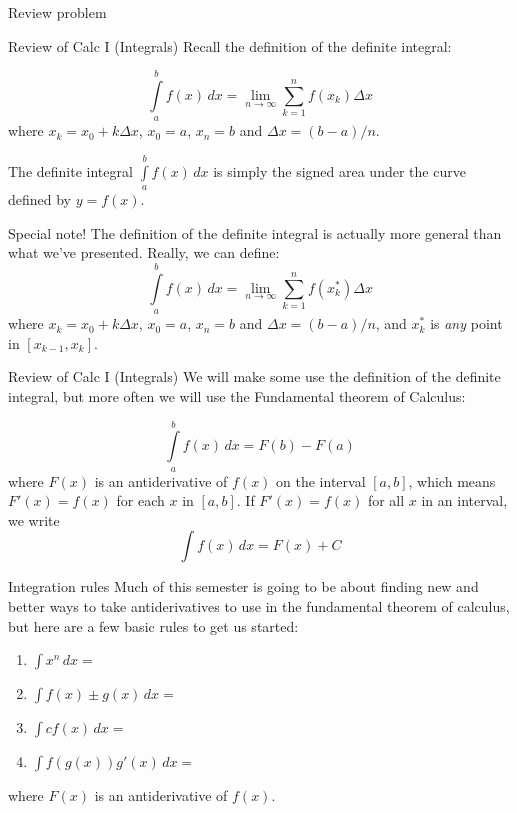 \documentclass[presentation]{beamer}
\begin{document}
\begin{frame}[label={sec:org7e92f56}]{Review problem}
\end{frame}

\begin{frame}[label={sec:orgad8b450}]{Review of Calc I (Integrals)}
Recall the definition of the definite integral:

\[
\int\limits_a^b f(x)\,dx = \lim_{n\rightarrow \infty}
\sum\limits_{k=1}^n f(x_k) \Delta x \]
where \(x_k = x_{0} + k\Delta x\), \(x_0 = a\), \(x_n = b\) and \(\Delta
x = (b-a)/n\).


The definite integral \(\int\limits_a^b f \left( x \right)\,dx\) is
simply the signed area under the curve defined by \(y = f \left( x
\right).\)
\end{frame}

\begin{frame}[label={sec:org699b568}]{Special note!}
The definition of the definite integral is actually more general than
what we've presented.  Really, we can define:
\[
\int\limits_a^b f(x)\,dx = \lim_{n\rightarrow \infty}
\sum\limits_{k=1}^n f(x^{*}_k) \Delta x \]
where \(x_k = x_{0} + k\Delta x\), \(x_0 = a\), \(x_n = b\) and \(\Delta
x = (b-a)/n\), and \(x_k^{*}\) is \emph{any} point in \(\left[ x_{k-1},x_k \right]\).
\vspace{10in}
\end{frame}

\begin{frame}[label={sec:orgcc02973}]{Review of Calc I (Integrals)}
We will make some use the definition of the definite integral, but
more often we will use the Fundamental theorem of Calculus:

\[
\int\limits_a^b f(x)\,dx = F(b) - F(a) \]
where \(F(x)\) is an antiderivative of \(f(x)\) on the interval
\(\left[ a,b \right]\), which means \(F'(x) = f(x)\) for each \(x\)
in \(\left[ a,b \right]\). If \(F'(x) = f(x)\) for all \(x\) in an
interval, we write
\[
\int f(x)\,dx = F(x) + C \]
\end{frame}

\begin{frame}[label={sec:org2dc75ff}]{Integration rules}
Much of this semester is going to be about finding new and better ways
to take antiderivatives to use in the fundamental theorem of calculus,
but here are a few basic rules to get us started:

\begin{enumerate}
\item \(\int x^n\,dx =\)
\item \(\int f(x) \pm g(x)\,dx =\)
\item \(\int c f(x)\,dx =\)
\item \(\int f(g(x))g'(x)\,dx =\)
\end{enumerate}

where \(F(x)\) is an antiderivative of \(f(x)\).
\end{frame}
\end{document}

